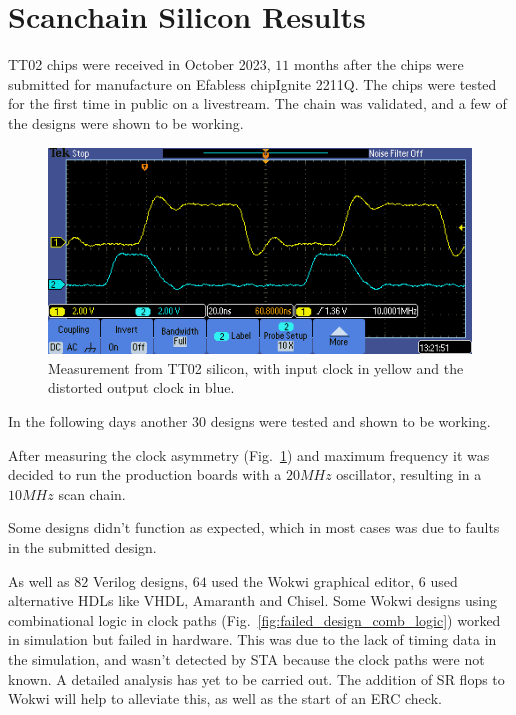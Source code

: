 \section{Scanchain Silicon Results}
\label{sec:scan_chain_res}

TT02 chips were received in October 2023, \(11\) months after the chips were submitted for manufacture on Efabless chipIgnite 2211Q.
The chips were tested for the first time in public on a livestream\cite{siliconalive}.
The chain was validated, and a few of the designs were shown to be working.

\begin{figure}[htp]
\centering
\includegraphics[width=\columnwidth]{./Figs/tt02_clock_out.png}
\caption{Measurement from TT02 silicon, with input clock in yellow and the distorted output clock in blue.}
\label{fig:TT02_clock_out}
\end{figure}

In the following days another \(30\) designs were tested and shown to be working.

After measuring the clock asymmetry (Fig.~\ref{fig:TT02_clock_out}) and maximum frequency it was decided to run the production boards with a \(20MHz\) oscillator, resulting in a \(10MHz\) scan chain.

Some designs didn’t function as expected, which in most cases was due to faults in the submitted design.

As well as \(82\) Verilog designs, \(64\) used the Wokwi graphical editor, \(6\) used alternative HDLs like VHDL, Amaranth\cite{amaranth} and Chisel\cite{chisel}.
Some Wokwi designs using combinational logic in clock paths (Fig.~\ref{fig:failed_design_comb_logic}) worked in simulation but failed in hardware.
This was due to the lack of timing data in the simulation, and wasn’t detected by STA because the clock paths were not known.
A detailed analysis has yet to be carried out.
The addition of SR flops to Wokwi will help to alleviate this, as well as the start of an ERC check.

